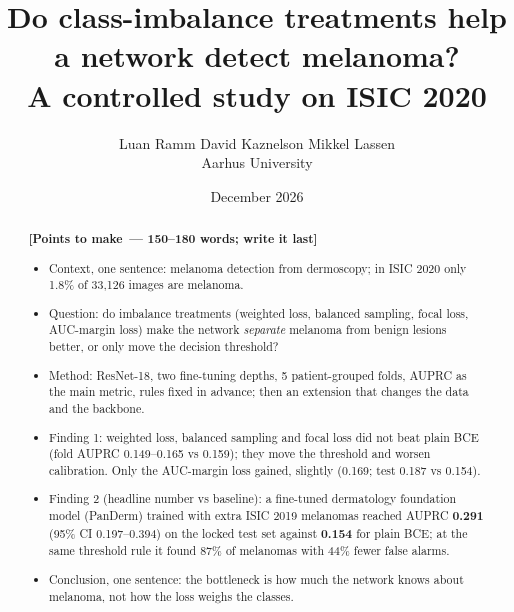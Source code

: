 \newenvironment{notes}[1][]{%
  \par\smallskip\noindent\color{noteink}\small
  \textbf{[Points to make\if\relax\detokenize{#1}\relax\else\ --- #1\fi]}
  \begin{itemize}[leftmargin=1.2em,itemsep=1pt,topsep=1pt]}
  {\end{itemize}\normalsize\color{black}\smallskip}

\renewcommand{\headeright}{DLVR 2026 -- Group 10}
\renewcommand{\undertitle}{Course project report}
\renewcommand{\shorttitle}{Class imbalance in melanoma classification}

\title{Do class-imbalance treatments help a network detect melanoma?\\
\large A controlled study on ISIC 2020}

\author{Luan Ramm \And David Kaznelson \And Mikkel Lassen \\
Aarhus University}
\date{December 2026}


\maketitle

\begin{abstract}
\begin{notes}[150--180 words; write it last]
  \item Context, one sentence: melanoma detection from dermoscopy; in ISIC 2020 only 1.8\% of 33,126 images are melanoma.
  \item Question: do imbalance treatments (weighted loss, balanced sampling, focal loss, AUC-margin loss) make the network \emph{separate} melanoma from benign lesions better, or only move the decision threshold?
  \item Method: ResNet-18, two fine-tuning depths, 5 patient-grouped folds, AUPRC as the main metric, rules fixed in advance; then an extension that changes the data and the backbone.
  \item Finding 1: weighted loss, balanced sampling and focal loss did not beat plain BCE (fold AUPRC 0.149--0.165 vs 0.159); they move the threshold and worsen calibration. Only the AUC-margin loss gained, slightly (0.169; test 0.187 vs 0.154).
  \item Finding 2 (headline number vs baseline): a fine-tuned dermatology foundation model (PanDerm) trained with extra ISIC 2019 melanomas reached AUPRC \textbf{0.291} (95\% CI 0.197--0.394) on the locked test set against \textbf{0.154} for plain BCE; at the same threshold rule it found 87\% of melanomas with 44\% fewer false alarms.
  \item Conclusion, one sentence: the bottleneck is how much the network knows about melanoma, not how the loss weighs the classes.
\end{notes}
\end{abstract}

